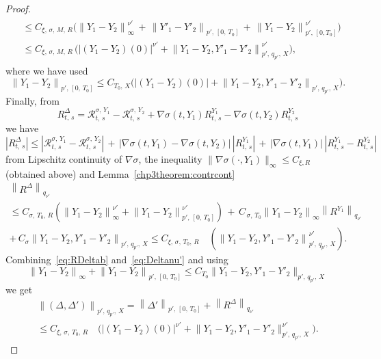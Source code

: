 \documentclass[AHL,Unicode,longabstracts,published]{cedram}
\newcommand{\calR}{\mathcal{R}}
\begin{document}
\begin{proof}
\begin{multline}
\begin{aligned}
&\leq C_{\xi,\,\sigma,\,M,\,R} \Big(\left\|Y_1-Y_2\right\|_{\infty}^{\nu'}\,+\,\left\|Y'_1-Y'_2\right\|_{p',\,\left[0,\,T_0\right]}\,+\, \left\|Y_1-Y_2\right\|_{p',\,\left[0,T_0\right]}^{{\nu'}}\Big)\\
&\leq C_{\xi,\,\sigma,\,M,\,R}\,\Big(\left|\left(Y_1-Y_2\right)(0)\right|^{\nu'}+\left\|Y_1-Y_2,Y'_1-Y'_2\right\|^{\nu'}_{p',\,q_{p'},\,X}\Big),
\end{aligned}
\end{multline}
where we have used
\[
\left\|Y_1-Y_2\right\|_{p',\,\left[0,\,T_0\right]}\leq C_{T_0,\,X} \Big(\left|\left(Y_1-Y_2\right)(0)\right|+\left\|Y_1-Y_2,Y'_1-Y'_2\right\|_{p',\,q_{p'},\,X}\Big).
\]
Finally, from
\[
R^{\Delta}_{t,\,s}=\calR^{\sigma,\,Y_1}_{t,\,s}-\calR^{\sigma,\,Y_2}_{t,\,s}+\nabla{\sigma}(t, Y_1)R_{t,\,s}^{Y_1}-\nabla{\sigma}(t, Y_2)R_{t,\,s}^{Y_2}
\]
we have
\[
\left|R^{\Delta}_{t,\,s}\right|\leq \left|\calR^{\sigma,\,Y_1}_{t,\,s}-\calR^{\sigma,\,Y_2}_{t,\,s}\right|\,+\,\big|\nabla{\sigma}\left(t, Y_1\right)-\nabla{\sigma}\left(t, Y_2\right)\big|\,\left|R_{t,\,s}^{Y_1}\right|\, + \,\left|\nabla{\sigma}\left(t, Y_1\right)\right|\,\left|R_{t,\,s}^{Y_1}-R_{t,\,s}^{Y_2}\right|
\]
from Lipschitz continuity of $\nabla\sigma$, the inequality $\|\nabla\sigma(\cdot, Y_1)\|_{\infty} \leq C_{\xi, R}$ (obtained above) and Lemma~\ref{chp3theorem:contrcont}
\begin{multline}\label{eq:RDeltab}
\left\|R^{\Delta}\right\|_{q_{\nu'}}\\
\leq C_{\sigma,\,T_0,\,R}\left(\left\|Y_1-Y_2\right\|^{\nu'}_{\infty}+\left\|Y_1-Y_2\right\|^{\nu'}_{p',\,\left[0,\,T_0\right]}\right)\,+\, C_{\,\sigma,\,T_0} \left\|Y_1-Y_2\right\|_{\infty} \left\|R^{Y_1}\right\|_{q_{\nu'}}\\
+\,C_{\sigma}\left\|Y_1-Y_2,Y'_1-Y'_2\right\|_{p',\,q_{p'},\,X}
\leq C_{\xi,\,\sigma,\,T_0,\,R}\quad \left(\left\|Y_1-Y_2,Y'_1-Y'_2\right\|^{\nu'}_{p',\,q_{p'},\, X}\right).
\end{multline}
Combining~\eqref{eq:RDeltab} and~\eqref{eq:Deltanu'} and using
\[
\left\|Y_1-Y_2\right\|_{\infty}+\left\|Y_1-Y_2\right\|_{p',\,\left[0,\,T_0\right]}\leq C_{T_0}\big\|Y_1-Y_2,Y'_1-Y'_2\big\|_{p',\, q_{p'},\,X}
\]
we get
\begin{multline*}
\left\|\left(\Delta,\Delta'\right)\right\|_{p',\, q_{p'},\,X}= \left\|\Delta'\right\|_{p',\,\left[0,\,T_0\right]}+ \left\|R^{\Delta}\right\|_{q_{\nu'}}\\
\leq C_{\xi,\,\sigma,\,T_0,\,R}\quad \Big(\left|\left(Y_1-Y_2\right)(0)\right|^{\nu'}+\big\|Y_1-Y_2,Y'_1-Y'_2\big\|^{\nu'}_{p',\,q_{p'},\,X}\Big).

\end{multline*}
\end{proof}
\end{document}
